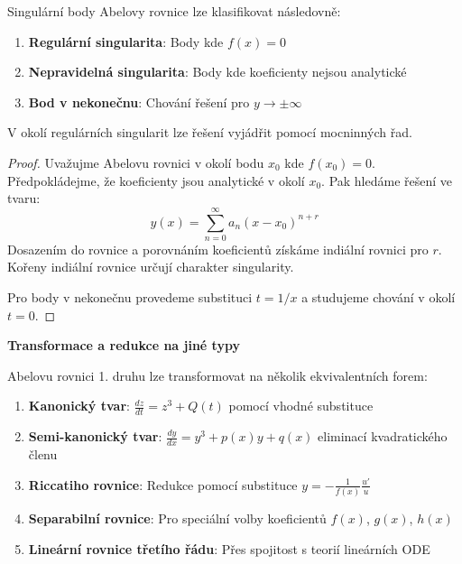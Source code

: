 \begin{theorem}
Singulární body Abelovy rovnice lze klasifikovat následovně:
\begin{enumerate}
\item \textbf{Regulární singularita}: Body kde $f(x) = 0$
\item \textbf{Nepravidelná singularita}: Body kde koeficienty nejsou analytické
\item \textbf{Bod v nekonečnu}: Chování řešení pro $y \to \pm\infty$
\end{enumerate}
V okolí regulárních singularit lze řešení vyjádřit pomocí mocninných řad.
\end{theorem}

\begin{proof}
Uvažujme Abelovu rovnici v okolí bodu $x_0$ kde $f(x_0) = 0$. Předpokládejme, že koeficienty jsou analytické v okolí $x_0$. Pak hledáme řešení ve tvaru:
\[
y(x) = \sum_{n=0}^\infty a_n (x - x_0)^{n+r}
\]
Dosazením do rovnice a porovnáním koeficientů získáme indiální rovnici pro $r$. Kořeny indiální rovnice určují charakter singularity.

Pro body v nekonečnu provedeme substituci $t = 1/x$ a studujeme chování v okolí $t = 0$.
\end{proof}

\vspace{1\baselineskip}

\noindent\textbf{Transformace a redukce na jiné typy}

Abelovu rovnici 1. druhu lze transformovat na několik ekvivalentních forem:

\begin{enumerate}
\item \textbf{Kanonický tvar}: $\frac{dz}{dt} = z^3 + Q(t)$ pomocí vhodné substituce

\item \textbf{Semi-kanonický tvar}: $\frac{dy}{dx} = y^3 + p(x)y + q(x)$ eliminací kvadratického členu

\item \textbf{Riccatiho rovnice}: Redukce pomocí substituce $y = -\frac{1}{f(x)}\frac{u'}{u}$

\item \textbf{Separabilní rovnice}: Pro speciální volby koeficientů $f(x)$, $g(x)$, $h(x)$

\item \textbf{Lineární rovnice třetího řádu}: Přes spojitost s teorií lineárních ODE
\end{enumerate}

